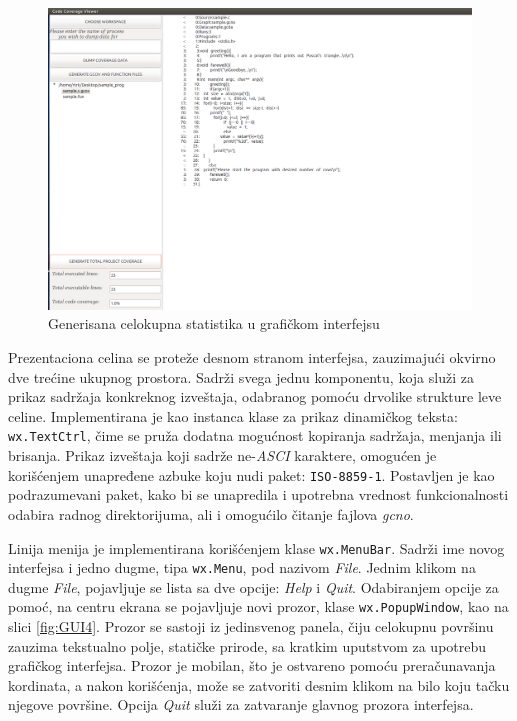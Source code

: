 \documentclass[12pt,oneside]{memoir}
\newcommand{\kod}[1]{\texttt{#1}}
\newcommand{\strano}[1]{\textit{#1}}
\begin{document}
\begin{figure}[!ht]
  \centering
  \includegraphics[width=\textwidth]{img/GUI_3.png}
  \caption{Generisana celokupna statistika u grafičkom interfejsu}
  \label{fig:GUI3}
\end{figure}

Prezentaciona celina se proteže desnom stranom interfejsa, zauzimajući okvirno dve trećine ukupnog prostora. Sadrži svega jednu komponentu, koja služi za prikaz sadržaja konkreknog izveštaja, odabranog pomoću drvolike strukture leve celine. Implementirana je kao instanca klase za prikaz dinamičkog teksta: \kod{wx.TextCtrl}, čime se pruža dodatna mogućnost kopiranja sadržaja, menjanja ili brisanja. Prikaz izveštaja koji sadrže ne-\strano{ASCI} karaktere, omogućen je korišćenjem unapređene azbuke koju nudi paket: \kod{ISO-8859-1}. Postavljen je kao podrazumevani paket, kako bi se unapredila i upotrebna vrednost funkcionalnosti odabira radnog direktorijuma, ali i omogućilo čitanje fajlova \strano{gcno}. 

Linija menija je implementirana korišćenjem klase \kod{wx.MenuBar}. Sadrži ime novog interfejsa i jedno dugme, tipa \kod{wx.Menu}, pod nazivom \strano{File}. Jednim klikom na dugme \strano{File}, pojavljuje se lista sa dve opcije: \strano{Help} i \strano{Quit}. Odabiranjem opcije za pomoć, na centru ekrana se pojavljuje novi prozor, klase \kod{wx.PopupWindow}, kao na slici \ref{fig:GUI4}. Prozor se sastoji iz jedinsvenog panela, čiju celokupnu površinu zauzima tekstualno polje, statičke prirode, sa kratkim uputstvom za upotrebu grafičkog interfejsa. Prozor je mobilan, što je ostvareno pomoću preračunavanja kordinata, a nakon korišćenja, može se zatvoriti desnim klikom na bilo koju tačku njegove površine. Opcija \strano{Quit} služi za zatvaranje glavnog prozora interfejsa.
\end{document}
